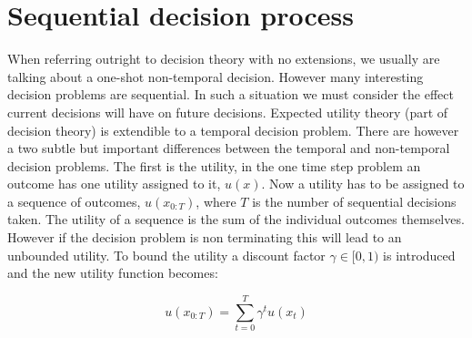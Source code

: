 \section{Sequential decision process}

When referring outright to decision theory with no extensions, we usually are talking about a one-shot
non-temporal decision. However many interesting decision problems are sequential.
In such a situation we must consider the effect current decisions will have on future decisions. Expected utility 
theory (part of decision theory) is extendible to a temporal decision problem. There are however a two subtle but important 
differences between the temporal and non-temporal decision problems. The first is the utility, in the one time step problem 
an outcome has one utility assigned to it, $u(x)$. Now a utility has to be assigned to a sequence of outcomes, $u(x_{0:T})$, 
where $T$ is the number of sequential decisions taken. The utility of a sequence is the sum of the individual outcomes 
themselves. However if the decision problem is non terminating this will lead to an unbounded utility. To bound the utility a 
discount factor $\gamma \in [0,1)$ is introduced and the new utility function becomes:

\begin{equation}
    u(x_{0:T}) 	   = \sum\limits_{t=0}^{T} \gamma^{t} u(x_t) \label{eq:joint_state_actions_util}
\end{equation}

